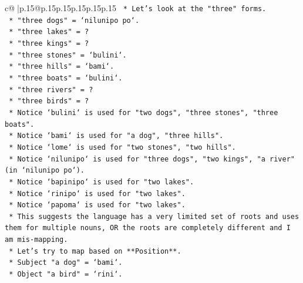 \documentclass{article}
\begin{document}
{\begin{supertabular}{c@{$\;$}|p{.15\linewidth}@{}p{.15\linewidth}p{.15\linewidth}p{.15\linewidth}p{.15\linewidth}p{.15\linewidth}}
{{{\texttt{                                *   Let's look at the "three" forms.} \\
\texttt{                                *   "three dogs" = `nilunipo po`.} \\
\texttt{                                *   "three lakes" = ?} \\
\texttt{                                *   "three kings" = ?} \\
\texttt{                                *   "three stones" = `bulini`.} \\
\texttt{                                *   "three hills" = `bami`.} \\
\texttt{                                *   "three boats" = `bulini`.} \\
\texttt{                                *   "three rivers" = ?} \\
\texttt{                                *   "three birds" = ?} \\
\texttt{                                *   Notice `bulini` is used for "two dogs", "three stones", "three boats".} \\
\texttt{                                *   Notice `bami` is used for "a dog", "three hills".} \\
\texttt{                                *   Notice `lome` is used for "two stones", "two hills".} \\
\texttt{                                *   Notice `nilunipo` is used for "three dogs", "two kings", "a river" (in `nilunipo po`).} \\
\texttt{                                *   Notice `bapinipo` is used for "two lakes".} \\
\texttt{                                *   Notice `rinipo` is used for "two lakes".} \\
\texttt{                                *   Notice `papoma` is used for "two lakes".} \\
\texttt{                                *   This suggests the language has a very limited set of roots and uses them for multiple nouns, OR the roots are completely different and I am mis{-}mapping.} \\
\texttt{                                *   Let's try to map based on **Position**.} \\
\texttt{                                *   Subject "a dog" = `bami`.} \\
\texttt{                                *   Object "a bird" = `rini`.} \\
}}}
\end{supertabular}}
\end{document}
